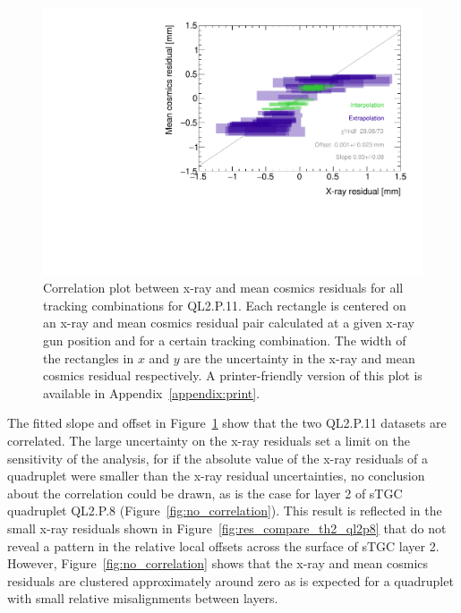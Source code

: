 \begin{figure}
    \centering
    \includegraphics[width = \textwidth]{figures/figure_QL2P11_3100V_2021-08-05_QL2P11_local_cosmic_and_xray_data_correlation_plot.pdf}
    \caption{Correlation plot between x-ray and mean cosmics residuals for all tracking combinations for QL2.P.11. Each rectangle is centered on an x-ray and mean cosmics residual pair calculated at a given x-ray gun position and for a certain tracking combination. The width of the rectangles in $x$ and $y$ are the uncertainty in the x-ray and mean cosmics residual respectively. A printer-friendly version of this plot is available in Appendix~\ref{appendix:print}.}
    \label{fig:correlation}
\end{figure}

The fitted slope and offset in Figure~\ref{fig:correlation} show that the two QL2.P.11 datasets are correlated. The large uncertainty on the x-ray residuals set a limit on the sensitivity of the analysis, for if the absolute value of the x-ray residuals of a quadruplet were smaller than the x-ray residual uncertainties, no conclusion about the correlation could be drawn, as is the case for layer 2 of sTGC quadruplet QL2.P.8 (Figure~\ref{fig:no_correlation}). This result is reflected in the small x-ray residuals shown in Figure~\ref{fig:res_compare_th2_ql2p8} that do not reveal a pattern in the relative local offsets across the surface of sTGC layer 2. However, Figure~\ref{fig:no_correlation} shows that the x-ray and mean cosmics residuals are clustered approximately around zero as is expected for a quadruplet with small relative misalignments between layers.

